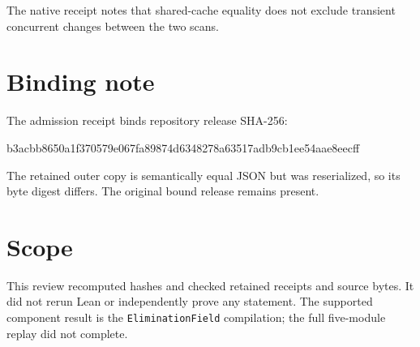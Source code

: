 \documentclass[10pt]{article}
\begin{document}
The native receipt notes that shared-cache equality does not exclude transient concurrent changes between the two scans.

\section*{Binding note}
The admission receipt binds repository release SHA-256:

{\footnotesize\ttfamily b3acbb8650a1f370579e067fa89874d6348278a63517adb9cb1ee54aae8eecff}

The retained outer copy is semantically equal JSON but was reserialized, so its byte digest differs. The original bound release remains present.

\section*{Scope}
This review recomputed hashes and checked retained receipts and source bytes. It did not rerun Lean or independently prove any statement. The supported component result is the \texttt{EliminationField} compilation; the full five-module replay did not complete.
\end{document}
